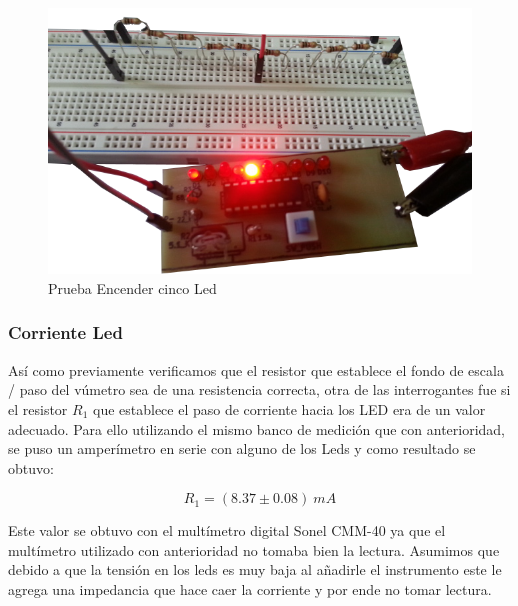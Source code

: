 \documentclass[12pt,a4paper]{article}
\begin{document}
			\begin{figure}[H]
			\centering
				\includegraphics[scale=0.6]{images/res2.png}\caption{Prueba Encender cinco Led}
			\end{figure}

			\subsubsection{Corriente Led}

			Así como previamente verificamos que el resistor que establece el fondo de escala / paso del vúmetro sea de una resistencia correcta, otra de las interrogantes fue si el resistor $R_1$ que establece el paso de corriente hacia los LED era de un valor adecuado. Para ello utilizando el mismo banco de medición que con anterioridad, se puso un amperímetro en serie con alguno de los Leds y como resultado se obtuvo:

			\begin{equation}
				R_1 = (8.37 \pm 0.08) \: mA
			\end{equation}

			Este valor se obtuvo con el multímetro digital Sonel CMM-40 ya que el multímetro utilizado con anterioridad no tomaba bien la lectura. Asumimos que debido a que la tensión en los leds es muy baja al añadirle el instrumento este le agrega una impedancia que hace caer la corriente y por ende no tomar lectura.
\end{document}
